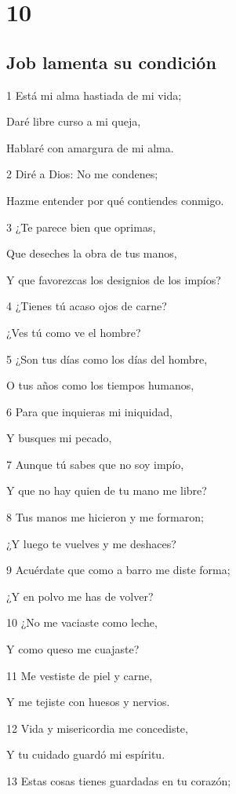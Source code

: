 \chapter{10}

\section*{Job lamenta su condición}

\par 1 Está mi alma hastiada de mi vida;
\par Daré libre curso a mi queja,
\par Hablaré con amargura de mi alma.
\par 2 Diré a Dios: No me condenes;
\par Hazme entender por qué contiendes conmigo.
\par 3 ¿Te parece bien que oprimas,
\par Que deseches la obra de tus manos,
\par Y que favorezcas los designios de los impíos?
\par 4 ¿Tienes tú acaso ojos de carne?
\par ¿Ves tú como ve el hombre?
\par 5 ¿Son tus días como los días del hombre,
\par O tus años como los tiempos humanos,
\par 6 Para que inquieras mi iniquidad,
\par Y busques mi pecado,
\par 7 Aunque tú sabes que no soy impío,
\par Y que no hay quien de tu mano me libre?
\par 8 Tus manos me hicieron y me formaron;
\par ¿Y luego te vuelves y me deshaces?
\par 9 Acuérdate que como a barro me diste forma;
\par ¿Y en polvo me has de volver?
\par 10 ¿No me vaciaste como leche,
\par Y como queso me cuajaste?
\par 11 Me vestiste de piel y carne,
\par Y me tejiste con huesos y nervios. 
\par 12 Vida y misericordia me concediste,
\par Y tu cuidado guardó mi espíritu.
\par 13 Estas cosas tienes guardadas en tu corazón;
